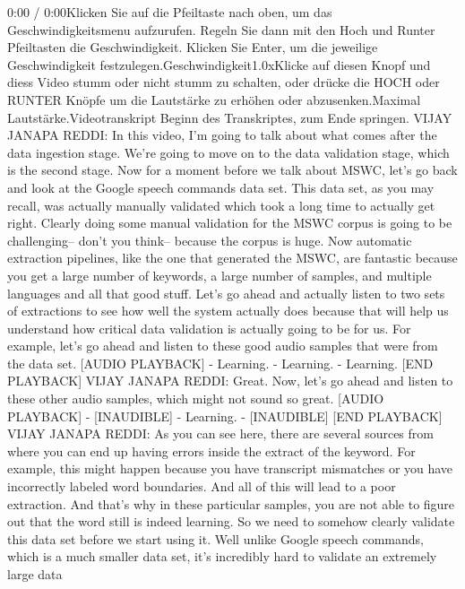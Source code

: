 {{{{    0:00 / 0:00Klicken Sie auf die Pfeiltaste nach oben, um das Geschwindigkeitsmenu aufzurufen. Regeln Sie dann mit den Hoch und Runter Pfeiltasten die Geschwindigkeit. Klicken Sie Enter, um die jeweilige Geschwindigkeit festzulegen.Geschwindigkeit1.0xKlicke auf diesen Knopf und diess Video stumm oder nicht stumm zu schalten, oder drücke die HOCH oder RUNTER Knöpfe um die Lautstärke zu erhöhen oder abzusenken.Maximal Lautstärke.Videotranskript
    Beginn des Transkriptes, zum Ende springen.
    VIJAY JANAPA REDDI: In this video, I'm going
    to talk about what comes after the data ingestion stage.
    We're going to move on to the data validation
    stage, which is the second stage.
    Now for a moment before we talk about MSWC, let's go back
    and look at the Google speech commands data set.
    This data set, as you may recall, was actually
    manually validated which took a long time to actually get right.
    Clearly doing some manual validation for the MSWC corpus is going to be
    challenging-- don't you think--
    because the corpus is huge.
    Now automatic extraction pipelines, like the one that generated the MSWC,
    are fantastic because you get a large number of keywords,
    a large number of samples, and multiple languages and all that good stuff.
    Let's go ahead and actually listen to two sets of extractions
    to see how well the system actually does because that
    will help us understand how critical data validation is actually
    going to be for us.
    For example, let's go ahead and listen to these good audio samples
    that were from the data set.
    [AUDIO PLAYBACK]
    - Learning.
    - Learning.
    - Learning.
    [END PLAYBACK]
    VIJAY JANAPA REDDI: Great.
    Now, let's go ahead and listen to these other audio samples,
    which might not sound so great.
    [AUDIO PLAYBACK]
    - [INAUDIBLE]
    - Learning.
    - [INAUDIBLE]
    [END PLAYBACK]
    VIJAY JANAPA REDDI: As you can see here, there
    are several sources from where you can end up having errors
    inside the extract of the keyword.
    For example, this might happen because you have transcript mismatches
    or you have incorrectly labeled word boundaries.
    And all of this will lead to a poor extraction.
    And that's why in these particular samples,
    you are not able to figure out that the word still is indeed learning.
    So we need to somehow clearly validate this data set before we start using it.
    Well unlike Google speech commands, which is a much smaller data set,
    it's incredibly hard to validate an extremely large data
}}}}
